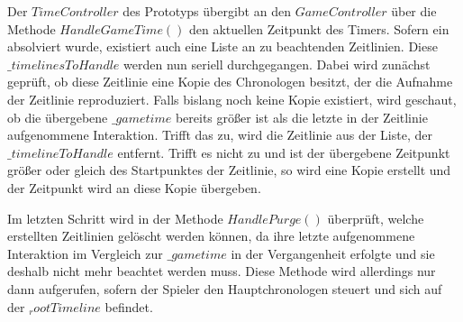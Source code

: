 Der $TimeController$ des Prototyps übergibt an den $GameController$ über die Methode $HandleGameTime()$ den aktuellen Zeitpunkt des Timers. Sofern ein  absolviert wurde, existiert auch eine Liste an zu beachtenden Zeitlinien. Diese $\_timelinesToHandle$ werden nun seriell durchgegangen. Dabei wird zunächst geprüft, ob diese Zeitlinie eine Kopie des Chronologen besitzt, der die Aufnahme der Zeitlinie reproduziert. Falls bislang noch keine Kopie existiert, wird geschaut, ob die übergebene $\_gametime$ bereits größer ist als die letzte in der Zeitlinie aufgenommene Interaktion. Trifft das zu, wird die Zeitlinie aus der Liste, der $\_timelineToHandle$ entfernt. Trifft es nicht zu und ist der übergebene Zeitpunkt größer oder gleich des Startpunktes der Zeitlinie, so wird eine Kopie erstellt und der Zeitpunkt wird an diese Kopie übergeben.

Im letzten Schritt wird in der Methode $HandlePurge()$ überprüft, welche erstellten Zeitlinien gelöscht werden können, da ihre letzte aufgenommene Interaktion im Vergleich zur $\_gametime$ in der Vergangenheit erfolgte und sie deshalb nicht mehr beachtet werden muss. Diese Methode wird allerdings nur dann aufgerufen, sofern der Spieler den Hauptchronologen steuert und sich auf der $_rootTimeline$ befindet.

